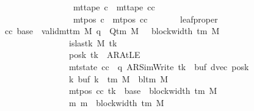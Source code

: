 \begin{isabellebody}
\ \ \ \ \ \ \ \ \ \ \ \ \ \ \ \ \ \ \ \ \ \ \ {\isasymand}\ mt{\isacharunderscore}{\kern0pt}tape\ c{\isacharprime}{\kern0pt}{\isacharprime}{\kern0pt}\ {\isacharequal}{\kern0pt}\ mt{\isacharunderscore}{\kern0pt}tape\ cc\isanewline
\ \ \ \ \ \ \ \ \ \ \ \ \ \ \ \ \ \ \ \ \ \ \ {\isasymand}\ mt{\isacharunderscore}{\kern0pt}pos\ c{\isacharprime}{\kern0pt}{\isacharprime}{\kern0pt}\ {\isacharequal}{\kern0pt}\ mt{\isacharunderscore}{\kern0pt}pos\ cc{\isachardoublequoteclose}\isanewline
\ \ \ \ \ \ \ leaf{\isacharunderscore}{\kern0pt}proper{\isacharcolon}{\kern0pt}\isanewline
\ \ \ \ \ \ \ \ {\isachardoublequoteopen}{\isasymAnd}cc\ base{\isacharprime}{\kern0pt}{\isachardot}{\kern0pt}\ {\isasymlbrakk}\ valid{\isacharunderscore}{\kern0pt}mttm\ M{\isacharsemicolon}{\kern0pt}\ q\ {\isasymin}\ Q{\isacharunderscore}{\kern0pt}tm\ M{\isacharsemicolon}{\kern0pt}\ {}\ {\isasymle}\ block{\isacharunderscore}{\kern0pt}width\ {\isacharparenleft}{\kern0pt}{\isasymGamma}{\isacharunderscore}{\kern0pt}tm\ M{\isacharparenright}{\kern0pt}{\isacharsemicolon}{\kern0pt}\isanewline
\ \ \ \ \ \ \ \ \ \ \ \ \ \ \ \ \ \ \ \ \ \ \ is{\isacharunderscore}{\kern0pt}last{\isacharunderscore}{\kern0pt}k\ M\ tk{\isacharsemicolon}{\kern0pt}\isanewline
\ \ \ \ \ \ \ \ \ \ \ \ \ \ \ \ \ \ \ \ \ \ \ posk\ tk\ {\isasymnoteq}\ AR{\isacharunderscore}{\kern0pt}AtLE{\isacharsemicolon}{\kern0pt}\isanewline
\ \ \ \ \ \ \ \ \ \ \ \ \ \ \ \ \ \ \ \ \ \ \ mt{\isacharunderscore}{\kern0pt}state\ cc\ {\isacharequal}{\kern0pt}\ {\isacharparenleft}{\kern0pt}q{\isacharcomma}{\kern0pt}\ AR{\isacharunderscore}{\kern0pt}SimWrite{\isacharcomma}{\kern0pt}\ tk{\isacharcomma}{\kern0pt}\ {}{\isacharcomma}{\kern0pt}\ buf{\isacharcomma}{\kern0pt}\ dvec{\isacharcomma}{\kern0pt}\ posk{\isacharparenright}{\kern0pt}{\isacharsemicolon}{\kern0pt}\isanewline
\ \ \ \ \ \ \ \ \ \ \ \ \ \ \ \ \ \ \ \ \ \ \ {\isasymforall}k{\isachardot}{\kern0pt}\ buf\ k\ {\isasymin}\ {\isasymGamma}{\isacharunderscore}{\kern0pt}tm\ M\ {\isasymunion}\ {\isacharbraceleft}{\kern0pt}bl{\isacharunderscore}{\kern0pt}tm\ M{\isacharbraceright}{\kern0pt}{\isacharsemicolon}{\kern0pt}\isanewline
\ \ \ \ \ \ \ \ \ \ \ \ \ \ \ \ \ \ \ \ \ \ \ mt{\isacharunderscore}{\kern0pt}pos\ cc\ tk\ {\isacharequal}{\kern0pt}\ base{\isacharprime}{\kern0pt}\ {\isacharplus}{\kern0pt}\ block{\isacharunderscore}{\kern0pt}width\ {\isacharparenleft}{\kern0pt}{\isasymGamma}{\isacharunderscore}{\kern0pt}tm\ M{\isacharparenright}{\kern0pt}{\isacharsemicolon}{\kern0pt}\isanewline
\ \ \ \ \ \ \ \ \ \ \ \ \ \ \ \ \ \ \ \ \ \ \ {\isasymAnd}m{\isachardot}{\kern0pt}\ m\ {\isasymle}\ block{\isacharunderscore}{\kern0pt}width\ {\isacharparenleft}{\kern0pt}{\isasymGamma}{\isacharunderscore}{\kern0pt}tm\ M{\isacharparenright}{\kern0pt}\isanewline

\end{isabellebody}
